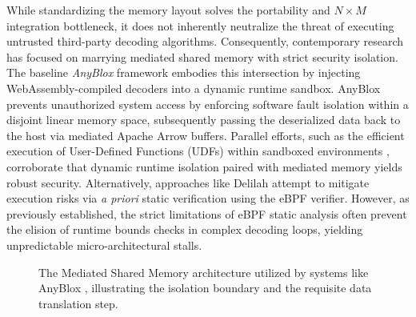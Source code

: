 \documentclass[onecolumn]{IEEEtran}
\numberwithin{equation}{section}
\theoremstyle{definition}
\theoremstyle{remark}
\begin{document}
While standardizing the memory layout solves the portability and $N \times M$ integration bottleneck, it does not inherently neutralize the threat of executing untrusted third-party decoding algorithms. Consequently, contemporary research has focused on marrying mediated shared memory with strict security isolation. The baseline \textit{AnyBlox} framework \cite{gienieczko2025anyblox} embodies this intersection by injecting WebAssembly-compiled decoders into a dynamic runtime sandbox. AnyBlox prevents unauthorized system access by enforcing software fault isolation within a disjoint linear memory space, subsequently passing the deserialized data back to the host via mediated Apache Arrow buffers. Parallel efforts, such as the efficient execution of User-Defined Functions (UDFs) within sandboxed environments \cite{sichert2024efficient}, corroborate that dynamic runtime isolation paired with mediated memory yields robust security. Alternatively, approaches like Delilah \cite{hedam2023delilah} attempt to mitigate execution risks via \textit{a priori} static verification using the eBPF verifier. However, as previously established, the strict limitations of eBPF static analysis often prevent the elision of runtime bounds checks in complex decoding loops, yielding unpredictable micro-architectural stalls.

\begin{figure}[htbp]
\centering
{}
\caption{The Mediated Shared Memory architecture utilized by systems like AnyBlox \cite{gienieczko2025anyblox}, illustrating the isolation boundary and the requisite data translation step.}
\label{fig:mediated_memory}
\end{figure}
\end{document}
